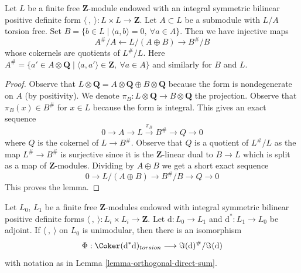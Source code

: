 \begin{lemma}
\label{lemma-orthogonal-direct-sum}
Let $L$ be a finite free $\mathbf{Z}$-module endowed
with an integral symmetric bilinear positive definite
form $\langle\ ,\ \rangle : L \times L \to \mathbf{Z}$.
Let $A \subset L$ be a submodule with $L/A$ torsion free. Set
$B = \{b \in L \mid \langle a, b\rangle = 0,\ \forall a \in A\}$.
Then we have injective maps
$$
A^\#/A \leftarrow L/(A \oplus B) \rightarrow B^\#/B
$$
whose cokernels are quotients of $L^\#/L$. Here
$A^\# = \{a' \in A \otimes \mathbf{Q} \mid
\langle a, a'\rangle \in \mathbf{Z},\ \forall a \in A\}$
and similarly for $B$ and $L$.
\end{lemma}

\begin{proof}
Observe that
$L \otimes \mathbf{Q} = A \otimes \mathbf{Q} \oplus B \otimes \mathbf{Q}$
because the form is nondegenerate on $A$ (by positivity).
We denote $\pi_B : L \otimes \mathbf{Q} \to B \otimes \mathbf{Q}$
the projection. Observe that $\pi_B(x) \in B^\#$ for $x \in L$
because the form is integral. This gives an exact sequence
$$
0 \to A \to L \xrightarrow{\pi_B} B^\# \to Q \to 0
$$
where $Q$ is the cokernel of $L \to B^\#$. Observe that $Q$
is a quotient of $L^\#/L$ as the map $L^\# \to B^\#$ is surjective
since it is the $\mathbf{Z}$-linear dual to $B \to L$ which is split
as a map of $\mathbf{Z}$-modules.
Dividing by $A \oplus B$ we get a short exact sequence
$$
0 \to L/(A \oplus B) \to B^\#/B \to Q \to 0
$$
This proves the lemma.
\end{proof}

\begin{lemma}
\label{lemma-coker}
Let $L_0$, $L_1$ be a finite free $\mathbf{Z}$-modules endowed
with integral symmetric bilinear positive definite
forms $\langle\ ,\ \rangle : L_i \times L_i \to \mathbf{Z}$.
Let $\text{d} : L_0 \to L_1$ and $\text{d}^* : L_1 \to L_0$
be adjoint. If $\langle\ ,\ \rangle$ on $L_0$ is unimodular, then
there is an isomorphism
$$
\Phi :
\Coker(\text{d}^*\text{d})_{torsion}
\longrightarrow
\Im(\text{d})^\#/\Im(\text{d})
$$
with notation as in Lemma \ref{lemma-orthogonal-direct-sum}.
\end{lemma}

